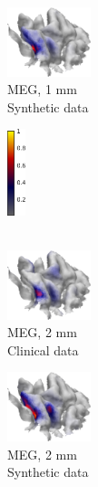 \documentclass[5p]{elsarticle}
\begin{document}
\begin{figure}[h!]
\begin{footnotesize}
\begin{center}
\begin{minipage}{3cm}
\begin{center}
\end{center}\end{minipage}
\begin{minipage}{3cm} \begin{center}
\includegraphics[height=2.0cm]{MAP_MEG_G_1mm_syntheticdata.png} \\ MEG, 1 mm \\ Synthetic data
\end{center}\end{minipage}\begin{minipage}{0.5cm} \begin{center}
\includegraphics[height=2.5cm]{colorbar.png} \\ \mbox{} \\ \mbox{}
\end{center}
\end{minipage} \vskip0.2cm
\begin{minipage}{3cm} \begin{center}
\includegraphics[height=2.0cm]{MAP_MEG_G_2mm.png}\\ MEG, 2 mm \\ Clinical data
\end{center}\end{minipage}
\begin{minipage}{3cm} \begin{center}
\includegraphics[height=2.0cm]{MAP_MEG_G_2mm_syntheticdata.png} \\ MEG, 2 mm \\ Synthetic data

\end{center}
\end{minipage}
\end{center}
\end{footnotesize}
\end{figure}
\end{document}
